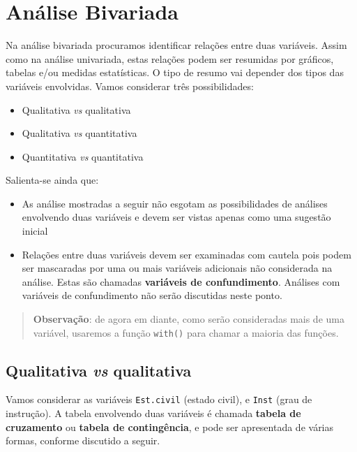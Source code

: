 \documentclass[10pt,a4paper]{book}
\providecommand{\tightlist}{%
  \setlength{\itemsep}{0pt}\setlength{\parskip}{0pt}}
\begin{document}
\section{Análise Bivariada}\label{analise-bivariada}

Na análise bivariada procuramos identificar relações entre duas
variáveis. Assim como na análise univariada, estas relações podem ser
resumidas por gráficos, tabelas e/ou medidas estatísticas. O tipo de
resumo vai depender dos tipos das variáveis envolvidas. Vamos considerar
três possibilidades:

\begin{itemize}
\tightlist
\item
  Qualitativa \emph{vs} qualitativa
\item
  Qualitativa \emph{vs} quantitativa
\item
  Quantitativa \emph{vs} quantitativa
\end{itemize}

Salienta-se ainda que:

\begin{itemize}
\tightlist
\item
  As análise mostradas a seguir não esgotam as possibilidades de
  análises envolvendo duas variáveis e devem ser vistas apenas como uma
  sugestão inicial
\item
  Relações entre duas variáveis devem ser examinadas com cautela pois
  podem ser mascaradas por uma ou mais variáveis adicionais não
  considerada na análise. Estas são chamadas \textbf{variáveis de
  confundimento}. Análises com variáveis de confundimento não serão
  discutidas neste ponto.
\end{itemize}

\begin{quote}
\textbf{Observação}: de agora em diante, como serão consideradas mais de
uma variável, usaremos a função \texttt{with()} para chamar a maioria
das funções.
\end{quote}

\subsection{\texorpdfstring{Qualitativa \emph{vs}
qualitativa}{Qualitativa vs qualitativa}}\label{qualitativa-vs-qualitativa}

Vamos considerar as variáveis \texttt{Est.civil} (estado civil), e
\texttt{Inst} (grau de instrução). A tabela envolvendo duas variáveis é
chamada \textbf{tabela de cruzamento} ou \textbf{tabela de
contingência}, e pode ser apresentada de várias formas, conforme
discutido a seguir.
\end{document}
